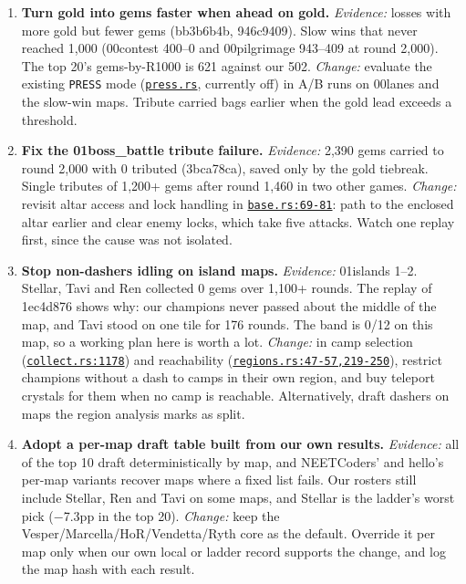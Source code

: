 \documentclass[11pt,a4paper]{article}
\newcommand{\repo}{file:///Users/tristanbasri/Desktop/Code/cambridge-battlecode-s2}
\newcommand{\code}[2]{\href{\repo/#1}{\texttt{\textcolor{cOurs!80!black}{#2}}}}
\newcommand{\vfive}{bots/bot-v5-r175199/src}
\begin{document}
\begin{enumerate}[leftmargin=1.4em, itemsep=0.45em]
\item \textbf{Turn gold into gems faster when ahead on gold.} \emph{Evidence:} losses with more gold but fewer gems (bb3b6b4b, 946c9409). Slow wins that never reached 1,000 (00contest 400--0 and 00pilgrimage 943--409 at round 2,000). The top 20's gems-by-R1000 is 621 against our 502. \emph{Change:} evaluate the existing \texttt{PRESS} mode (\code{bots/bot-v5/src/common/press.rs}{press.rs}, currently off) in A/B runs on 00lanes and the slow-win maps. Tribute carried bags earlier when the gold lead exceeds a threshold.

\item \textbf{Fix the 01boss\_battle tribute failure.} \emph{Evidence:} 2,390 gems carried to round 2,000 with 0 tributed (3bca78ca), saved only by the gold tiebreak. Single tributes of 1,200+ gems after round 1,460 in two other games. \emph{Change:} revisit altar access and lock handling in \code{\vfive/common/base.rs}{base.rs:69-81}: path to the enclosed altar earlier and clear enemy locks, which take five attacks. Watch one replay first, since the cause was not isolated.

\item \textbf{Stop non-dashers idling on island maps.} \emph{Evidence:} 01islands 1--2. Stellar, Tavi and Ren collected 0 gems over 1,100+ rounds. The replay of 1ec4d876 shows why: our champions never passed about the middle of the map, and Tavi stood on one tile for 176 rounds. The band is 0/12 on this map, so a working plan here is worth a lot. \emph{Change:} in camp selection (\code{\vfive/common/collect.rs}{collect.rs:1178}) and reachability (\code{\vfive/regions.rs}{regions.rs:47-57,219-250}), restrict champions without a dash to camps in their own region, and buy teleport crystals for them when no camp is reachable. Alternatively, draft dashers on maps the region analysis marks as split.

\item \textbf{Adopt a per-map draft table built from our own results.} \emph{Evidence:} all of the top 10 draft deterministically by map, and NEETCoders' and hello's per-map variants recover maps where a fixed list fails. Our rosters still include Stellar, Ren and Tavi on some maps, and Stellar is the ladder's worst pick ($-$7.3pp in the top 20). \emph{Change:} keep the Vesper/Marcella/HoR/Vendetta/Ryth core as the default. Override it per map only when our own local or ladder record supports the change, and log the map hash with each result.


\end{enumerate}
\end{document}
